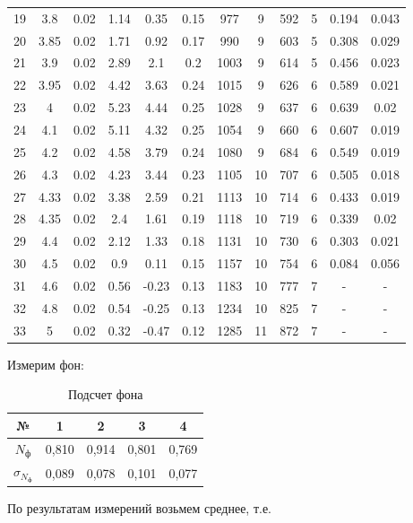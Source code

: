 \documentclass[12pt]{kiarticle}
\begin{document}
\begin{table}[h!]
\begin{center}
\begin{tabular}{|c|c|c|c|c|c|c|c|c|c|c|c|}
19 & 3.8 & 0.02 & 1.14 & 0.35 & 0.15 & 977 & 9 & 592 & 5 & 0.194 & 0.043 \\
20 & 3.85 & 0.02 & 1.71 & 0.92 & 0.17 & 990 & 9 & 603 & 5 & 0.308 & 0.029 \\
21 & 3.9 & 0.02 & 2.89 & 2.1 & 0.2 & 1003 & 9 & 614 & 5 & 0.456 & 0.023 \\
22 & 3.95 & 0.02 & 4.42 & 3.63 & 0.24 & 1015 & 9 & 626 & 6 & 0.589 & 0.021 \\
23 & 4 & 0.02 & 5.23 & 4.44 & 0.25 & 1028 & 9 & 637 & 6 & 0.639 & 0.02 \\
24 & 4.1 & 0.02 & 5.11 & 4.32 & 0.25 & 1054 & 9 & 660 & 6 & 0.607 & 0.019 \\
25 & 4.2 & 0.02 & 4.58 & 3.79 & 0.24 & 1080 & 9 & 684 & 6 & 0.549 & 0.019 \\
26 & 4.3 & 0.02 & 4.23 & 3.44 & 0.23 & 1105 & 10 & 707 & 6 & 0.505 & 0.018 \\
27 & 4.33 & 0.02 & 3.38 & 2.59 & 0.21 & 1113 & 10 & 714 & 6 & 0.433 & 0.019 \\
28 & 4.35 & 0.02 & 2.4 & 1.61 & 0.19 & 1118 & 10 & 719 & 6 & 0.339 & 0.02 \\
29 & 4.4 & 0.02 & 2.12 & 1.33 & 0.18 & 1131 & 10 & 730 & 6 & 0.303 & 0.021 \\
30 & 4.5 & 0.02 & 0.9 & 0.11 & 0.15 & 1157 & 10 & 754 & 6 & 0.084 & 0.056 \\
31 & 4.6 & 0.02 & 0.56 & -0.23 & 0.13 & 1183 & 10 & 777 & 7 & - & - \\
32 & 4.8 & 0.02 & 0.54 & -0.25 & 0.13 & 1234 & 10 & 825 & 7 &- & - \\
33 & 5 & 0.02 & 0.32 & -0.47 & 0.12 & 1285 & 11 & 872 & 7 & - & - \\
			\hline
		\end{tabular}
	\end{center}
	\label{table_1}
\end{table}

Измерим фон:
\begin{table}[H]
	\caption{Подсчет фона}
\begin{center}
	\begin{tabular}{|c|c|c|c|c|}
	\hline 
	№ & 1 & 2 & 3 & 4 \\ 
	\hline 
	$ N_ф $ & 0,810 & 0,914 & 0,801 & 0,769 \\ 
	\hline 
	$ \sigma_{N_ф }$ & 0,089 & 0,078 & 0,101 & 0,077 \\ 
	\hline 
\end{tabular}
\end{center} 
\end{table}
По результатам измерений возьмем среднее, т.е. 
\end{document}
